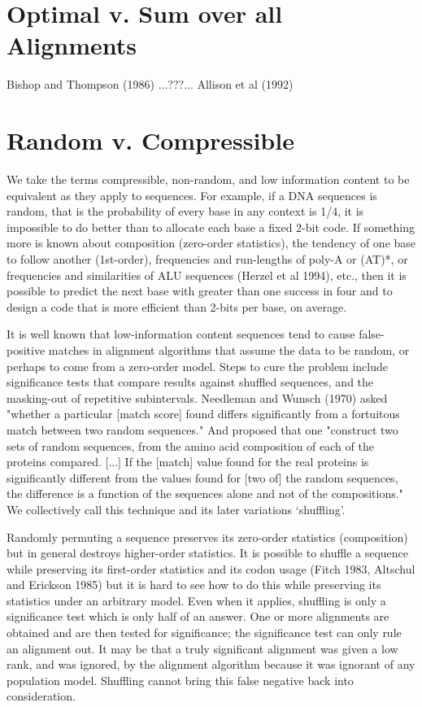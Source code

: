 \documentclass[letterpaper,11pt,oneside]{article}
\begin{document}
\section{Optimal v. Sum over all Alignments}

Bishop and Thompson (1986) ...???...
Allison et al (1992)


\section{Random v. Compressible}

We take the terms compressible, non-random, and low information content
to be equivalent as they apply to sequences.
For example, if a DNA sequences is random, that is the probability of every
base in any context is 1/4, it is impossible to do better than to allocate
each base a fixed 2-bit code.
If something more is known about composition (zero-order statistics),
the tendency of one base to follow another (1st-order),
frequencies and run-lengths of poly-A or (AT)*, or
frequencies and similarities of ALU sequences (Herzel et al 1994), etc.,
then it is possible to predict the next base with greater than one success
in four and to design a code that is more efficient than 2-bits per base,
on average.

It is well known that low-information content sequences tend to cause
false-positive matches in alignment algorithms that assume
the data to be random, or perhaps to come from a zero-order model.
Steps to cure the problem include
significance tests that compare results against shuffled sequences, and
the masking-out of repetitive subintervals.
Needleman and Wunsch (1970)
asked "whether a particular [match score] found differs significantly
from a fortuitous match between two random sequences."
And proposed that one "construct two sets of random sequences,
from the amino acid composition of each of the proteins compared. [...]
If the [match] value found for the real proteins is significantly different
from the values found for [two of] the random sequences,
the difference is a function of the sequences alone and
not of the compositions."
We collectively call this technique and its later variations `shuffling'.

Randomly permuting a sequence preserves its zero-order statistics (composition)
but in general destroys higher-order statistics.
It is possible to shuffle a sequence while preserving its first-order
statistics and its codon usage (Fitch 1983, Altschul and Erickson 1985) but
it is hard to see how to do this while preserving its statistics under
an arbitrary model.
Even when it applies,
shuffling is only a significance test which is only half of an answer.
One or more alignments are obtained and are then tested for significance;
the significance test can only rule an alignment out.
It may be that a truly significant alignment was given a low rank,
and was ignored, by the alignment algorithm because it was
ignorant of any population model.
Shuffling cannot bring this false negative back into consideration.
\end{document}
